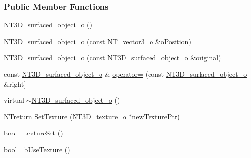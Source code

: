\subsubsection*{Public Member Functions}
\begin{DoxyCompactItemize}
\item 
\hyperlink{class_n_t3_d__surfaced__object__o_ac2e552e5158173b5048c8ed19dc01e2c}{NT3D\_\-surfaced\_\-object\_\-o} ()
\item 
\hyperlink{class_n_t3_d__surfaced__object__o_a91d9bda65bc623a726cbcadd99676064}{NT3D\_\-surfaced\_\-object\_\-o} (const \hyperlink{class_n_t__vector3__o}{NT\_\-vector3\_\-o} \&oPosition)
\item 
\hyperlink{class_n_t3_d__surfaced__object__o_a51d98cf4cd56b56ef6ba3ce001919eb8}{NT3D\_\-surfaced\_\-object\_\-o} (const \hyperlink{class_n_t3_d__surfaced__object__o}{NT3D\_\-surfaced\_\-object\_\-o} \&original)
\item 
const \hyperlink{class_n_t3_d__surfaced__object__o}{NT3D\_\-surfaced\_\-object\_\-o} \& \hyperlink{class_n_t3_d__surfaced__object__o_ac61b79b248d9729a6cfe88b19b73ff78}{operator=} (const \hyperlink{class_n_t3_d__surfaced__object__o}{NT3D\_\-surfaced\_\-object\_\-o} \&right)
\item 
virtual \hyperlink{class_n_t3_d__surfaced__object__o_a8d8283b96cbdd0bb4431e937a39ff4fa}{$\sim$NT3D\_\-surfaced\_\-object\_\-o} ()
\item 
\hyperlink{nt__types_8h_ab9564ee8f091e809d21b8451c6683c53}{NTreturn} \hyperlink{class_n_t3_d__surfaced__object__o_a9dfb7870b2786526870f4769411ee20b}{SetTexture} (\hyperlink{class_n_t3_d__texture__o}{NT3D\_\-texture\_\-o} $\ast$newTexturePtr)
\item 
bool \hyperlink{class_n_t3_d__surfaced__object__o_a6c37962ce930b3650f466ed88ee2bbea}{\_\-textureSet} ()
\item 
bool \hyperlink{class_n_t3_d__surfaced__object__o_ad21eeaaa4e9cec6dfbf1f3588ea8ac36}{\_\-bUseTexture} ()
\end{DoxyCompactItemize}
